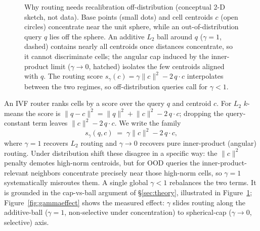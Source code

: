 \documentclass{article}
\begin{document}
\begin{figure}[t]
\caption{Why routing needs recalibration off-distribution (conceptual 2-D sketch, not data).
Base points (small dots) and cell centroids $c$ (open circles) concentrate near the unit
sphere, while an out-of-distribution query $q$ lies off the sphere. An additive $L_2$ ball
around $q$ ($\gamma=1$, dashed) contains nearly all centroids once distances concentrate,
so it cannot discriminate cells; the angular cap induced by the inner-product limit
($\gamma\to 0$, hatched) isolates the few centroids aligned with $q$. The routing score
$s_\gamma(c) = \gamma\|c\|^2 - 2\,q\cdot c$ interpolates between the two regimes, so
off-distribution queries call for $\gamma < 1$.}
\label{fig:capball}
\end{figure}

\label{sec:gamma}
An IVF router ranks cells by a score over the query $q$ and centroid $c$. For $L_2$
$k$-means the score is $\lVert q-c\rVert^2 = \lVert q\rVert^2 + \lVert c\rVert^2 -
2\,q\!\cdot\!c$; dropping the query-constant term leaves
$\lVert c\rVert^2 - 2\,q\!\cdot\!c$. We write the family
\begin{equation}
\label{eq:gamma}
s_\gamma(q,c) \;=\; \gamma\lVert c\rVert^2 - 2\,q\!\cdot\!c ,
\end{equation}
where $\gamma{=}1$ recovers $L_2$ routing and $\gamma{\to}0$ recovers pure
inner-product (angular) routing. Under distribution shift these disagree in a
specific way: the $\lVert c\rVert^2$ penalty demotes high-norm centroids, but for
OOD queries the inner-product-relevant neighbors concentrate precisely near those
high-norm cells, so $\gamma{=}1$ systematically misroutes them. A single global
$\gamma{<}1$ rebalances the two terms. It is grounded in the cap-vs-ball argument of
\S\ref{sec:theory}, illustrated in Figure~\ref{fig:capball}; Figure~\ref{fig:gammaeffect}
shows the measured effect: $\gamma$ slides routing along the additive-ball ($\gamma{=}1$,
non-selective under concentration) to spherical-cap ($\gamma{\to}0$, selective) axis.
\end{document}
